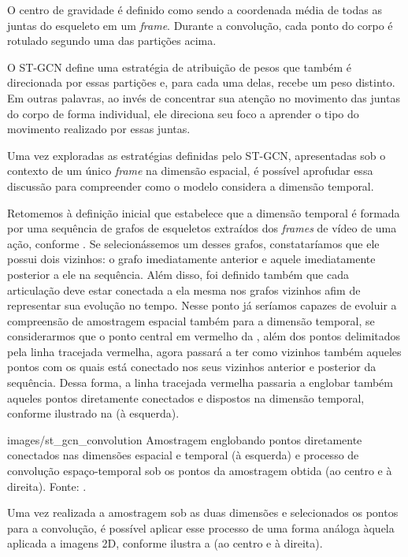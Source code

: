 O centro de gravidade é definido como sendo a coordenada média de todas as juntas do esqueleto em um \textit{frame}. Durante a convolução, cada ponto do corpo é rotulado segundo uma das partições acima.

O ST-GCN define uma estratégia de atribuição de pesos que também é direcionada por essas partições e, para cada uma delas, recebe um peso distinto. Em outras palavras, ao invés de concentrar sua atenção no movimento das juntas do corpo de forma individual, ele direciona seu foco a aprender o tipo do movimento realizado por essas juntas.

Uma vez exploradas as estratégias definidas pelo ST-GCN, apresentadas sob o contexto de um único \textit{frame} na dimensão espacial, é possível aprofudar essa discussão para compreender como o modelo considera a dimensão temporal. 

Retomemos à definição inicial que estabelece que a dimensão temporal é formada por uma sequência de grafos de esqueletos extraídos dos \textit{frames} de vídeo de uma ação, conforme . Se selecionássemos um desses grafos, constataríamos que ele possui dois vizinhos: o grafo imediatamente anterior e aquele imediatamente posterior a ele na sequência. Além disso, foi definido também que cada articulação deve estar conectada a ela mesma nos grafos vizinhos afim de representar sua evolução no tempo. Nesse ponto já seríamos capazes de evoluir a compreensão de amostragem espacial também para a dimensão temporal, se considerarmos que o ponto central em vermelho da , além dos pontos delimitados pela linha tracejada vermelha, agora passará a ter como vizinhos também aqueles pontos com os quais está conectado nos seus vizinhos anterior e posterior da sequência. Dessa forma, a linha tracejada vermelha passaria a englobar também aqueles pontos diretamente conectados e dispostos na dimensão temporal, conforme ilustrado na  (à esquerda).

    {images/st_gcn_convolution}
    {Amostragem englobando pontos diretamente conectados nas dimensões espacial e temporal (à esquerda) e processo de convolução espaço-temporal sob os pontos da amostragem obtida (ao centro e à direita).  Fonte: \cite[p. 3]{st-gcn-2018}.}

Uma vez realizada a amostragem sob as duas dimensões e selecionados os pontos para a convolução, é possível aplicar esse processo de uma forma análoga àquela aplicada a imagens 2D, conforme ilustra a  (ao centro e à direita).


